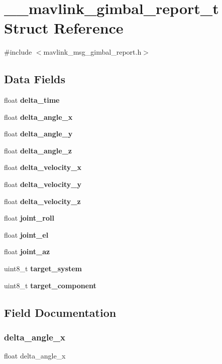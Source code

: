\section{\+\_\+\+\_\+mavlink\+\_\+gimbal\+\_\+report\+\_\+t Struct Reference}
\label{struct____mavlink__gimbal__report__t}


{\ttfamily \#include $<$mavlink\+\_\+msg\+\_\+gimbal\+\_\+report.\+h$>$}

\subsection*{Data Fields}
\begin{DoxyCompactItemize}
\item 
float \textbf{ delta\+\_\+time}
\item 
float \textbf{ delta\+\_\+angle\+\_\+x}
\item 
float \textbf{ delta\+\_\+angle\+\_\+y}
\item 
float \textbf{ delta\+\_\+angle\+\_\+z}
\item 
float \textbf{ delta\+\_\+velocity\+\_\+x}
\item 
float \textbf{ delta\+\_\+velocity\+\_\+y}
\item 
float \textbf{ delta\+\_\+velocity\+\_\+z}
\item 
float \textbf{ joint\+\_\+roll}
\item 
float \textbf{ joint\+\_\+el}
\item 
float \textbf{ joint\+\_\+az}
\item 
uint8\+\_\+t \textbf{ target\+\_\+system}
\item 
uint8\+\_\+t \textbf{ target\+\_\+component}
\end{DoxyCompactItemize}


\subsection{Field Documentation}
\mbox{\label{struct____mavlink__gimbal__report__t_aea65fa58a4e1df7977b6f361cd8b3089}} 
\subsubsection{delta\+\_\+angle\+\_\+x}
{\footnotesize\ttfamily float delta\+\_\+angle\+\_\+x}


